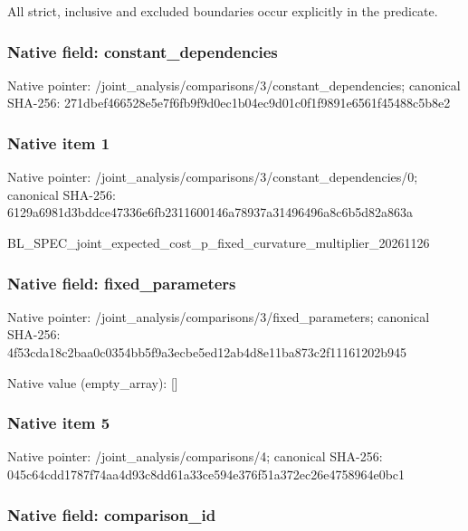 \documentclass[10pt,a4paper]{article}
\begin{document}
All strict, inclusive and excluded boundaries occur explicitly in the predicate.


\subsubsection{Native field: constant\_dependencies}


Native pointer: /joint\_analysis/comparis\allowbreak{}ons/3/constant\_dependenc\allowbreak{}ies; canonical SHA-256: 271dbef466528e5e7f6fb9f9\allowbreak{}d0ec1b04ec9d01c0f1f9891e\allowbreak{}6561f45488c5b8e2



\subsubsection{Native item 1}


Native pointer: /joint\_analysis/comparis\allowbreak{}ons/3/constant\_dependenc\allowbreak{}ies/0; canonical SHA-256: 6129a6981d3bddce47336e6f\allowbreak{}b2311600146a78937a314964\allowbreak{}96a8c6b5d82a863a


BL\_SPEC\_joint\_expected\_c\allowbreak{}ost\_p\_fixed\_curvature\_mu\allowbreak{}ltiplier\_20261126


\subsubsection{Native field: fixed\_parameters}


Native pointer: /joint\_analysis/comparis\allowbreak{}ons/3/fixed\_parameters; canonical SHA-256: 4f53cda18c2baa0c0354bb5f\allowbreak{}9a3ecbe5ed12ab4d8e11ba87\allowbreak{}3c2f11161202b945



Native value (empty\_array): []



\subsubsection{Native item 5}


Native pointer: /joint\_analysis/comparisons/4; canonical SHA-256: 045c64cdd1787f74aa4d93c8\allowbreak{}dd61a33ce594e376f51a372e\allowbreak{}c26e4758964e0bc1



\subsubsection{Native field: comparison\_id}
\end{document}

